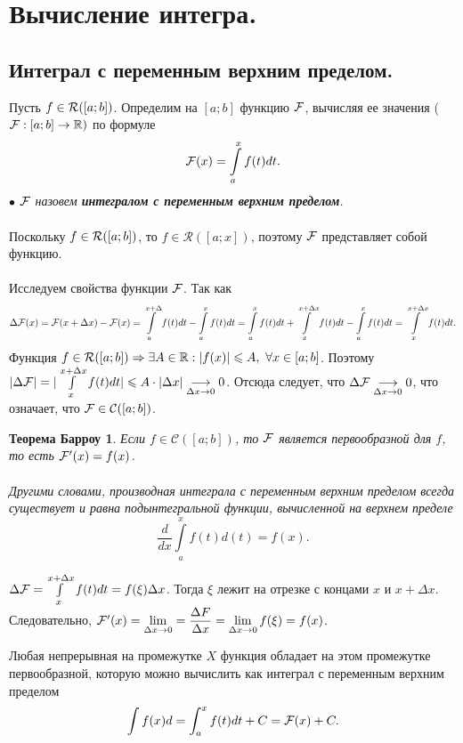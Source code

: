 \section{Вычисление интегра.}
\subsection{Интеграл с переменным верхним пределом.}
Пусть $f\in\mathcal{R}([a; b])$. Определим на $[a;b]$ функцию $\mathcal{F}$, вычисляя ее значения ($\mathcal{F}:[a;b]\to\mathbb{R})$ по формуле $$\mathcal{F}(x) = \int\limits_a^xf(t)dt.$$
$\bullet$ \textit{$\mathcal{F}$ назовем \textbf{интегралом с переменным верхним пределом}.}\\\\
Поскольку $f\in\mathcal{R}([a; b])$, то $f\in\mathcal{R}([a;x])$, поэтому $\mathcal{F}$ представляет собой функцию.\\\\
Исследуем свойства функции $\mathcal{F}$. Так как $$\Delta\mathcal{F}(x) = \mathcal{F}(x+\Delta x) - \mathcal{F}(x) = \int\limits_a^{x+\Delta}f(t)dt - \int\limits_a^xf(t)dt = \int\limits_a^xf(t)dt + \int\limits_x^{x+\Delta x}f(t)dt - \int\limits_a^xf(t)dt = \int\limits_x^{x +\Delta x}f(t)dt.$$
Функция $f\in\mathcal{R}([a; b])\Rightarrow \exists A \in \mathbb{R} : |f(x)|\leqslant A,\ \forall x\in [a;b]$. Поэтому $|\Delta \mathcal{F}| = |\int\limits_x^{x+\Delta x}f(t)dt|\leqslant A\cdot |\Delta x|\underset{\Delta x \to 0}{\longrightarrow} 0$. Отсюда следует, что $\Delta \mathcal{F} \underset{\Delta x \to 0}{\longrightarrow} 0$, что означает, что $\mathcal{F}\in\mathcal{C}([a;b])$.
\newtheorem*{thbrow}{Теорема Барроу}
\begin{thbrow}
	Если $f\in\mathcal{C}([a;b])$, то $\mathcal{F}$ является первообразной для $f$, то есть $\mathcal{F}'(x) = f(x)$.\\\\
	Другими словами, производная интеграла с переменным верхним пределом всегда существует и равна подынтегральной функции, вычисленной на верхнем пределе $$\dfrac{d}{dx}\int\limits_a^xf(t)d(t) = f(x).$$
	\end{thbrow}
\begin{Proof}
	$\Delta \mathcal{F} = \int\limits_x^{x + \Delta x}f(t)dt = f(\xi)\Delta x$. Тогда $\xi$ лежит на отрезке с концами $x$ и $x + \Delta x$. Следовательно, $\mathcal{F}'(x) = \lim\limits_{\Delta x \to 0} = \dfrac{\Delta F}{\Delta x} = \lim\limits_{\Delta x \to 0} f(\xi) = f(x)$.
	\end{Proof}
\begin{corollary}
	Любая непрерывная на промежутке $X$ функция обладает на этом промежутке первообразной, которую можно вычислить как интеграл с переменным верхним пределом $$\int f(x)d = \int_a^x f(t)dt + C = \mathcal{F}(x) + C.$$
	\end{corollary}
